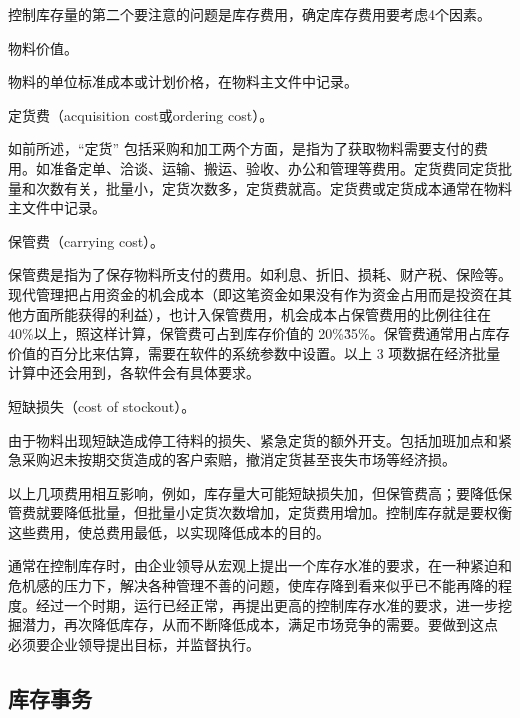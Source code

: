     控制库存量的第二个要注意的问题是库存费用，确定库存费用要考虑4个因素。

    \begin{enumerate.zh}
        \item 物料价值。

        物料的单位标准成本或计划价格，在物料主文件中记录。

        \item 定货费（acquisition cost或ordering cost）。

        如前所述，“定货” 包括采购和加工两个方面，是指为了获取物料需要支付的费用。如准备定单、洽谈、运输、搬运、验收、办公和管理等费用。定货费同定货批量和次数有关，批量小，定货次数多，定货费就高。定货费或定货成本通常在物料主文件中记录。

        \item 保管费（carrying cost）。

        保管费是指为了保存物料所支付的费用。如利息、折旧、损耗、财产税、保险等。现代管理把占用资金的机会成本（即这笔资金如果没有作为资金占用而是投资在其他方面所能获得的利益），也计入保管费用，机会成本占保管费用的比例往往在40\%以上，照这样计算，保管费可占到库存价值的 20\%\~35\%。保管费通常用占库存价值的百分比来估算，需要在软件的系统参数中设置。以上 3 项数据在经济批量计算中还会用到，各软件会有具体要求。

        \item 短缺损失（cost of stockout）。

        由于物料出现短缺造成停工待料的损失、紧急定货的额外开支。包括加班加点和紧急采购迟未按期交货造成的客户索赔，撤消定货甚至丧失市场等经济损。

    \end{enumerate.zh}

    以上几项费用相互影响，例如，库存量大可能短缺损失加，但保管费高；要降低保管费就要降低批量，但批量小定货次数增加，定货费用增加。控制库存就是要权衡这些费用，使总费用最低，以实现降低成本的目的。

    通常在控制库存时，由企业领导从宏观上提出一个库存水准的要求，在一种紧迫和危机感的压力下，解决各种管理不善的问题，使库存降到看来似乎已不能再降的程度。经过一个时期，运行已经正常，再提出更高的控制库存水准的要求，进一步挖掘潜力，再次降低库存，从而不断降低成本，满足市场竞争的需要。要做到这点 必须要企业领导提出目标，并监督执行。

\subsection {库存事务}

